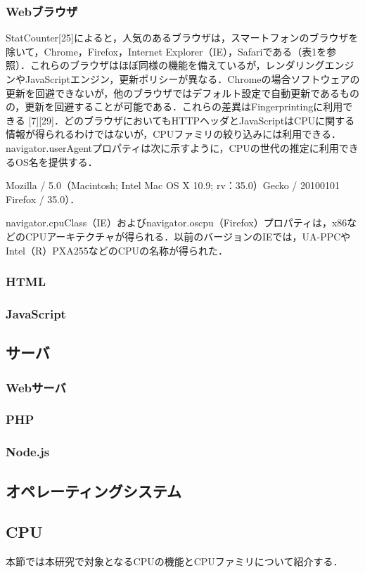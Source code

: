 \subsubsection{Webブラウザ}
StatCounter[25]によると，人気のあるブラウザは，スマートフォンのブラウザを除いて，Chrome，Firefox，Internet Explorer（IE），Safariである（表1を参照）．これらのブラウザはほぼ同様の機能を備えているが，レンダリングエンジンやJavaScriptエンジン，更新ポリシーが異なる．Chromeの場合ソフトウェアの更新を回避できないが，他のブラウザではデフォルト設定で自動更新であるものの，更新を回避することが可能である．これらの差異はFingerprintingに利用できる [7][29]．どのブラウザにおいてもHTTPヘッダとJavaScriptはCPUに関する情報が得られるわけではないが，CPUファミリの絞り込みには利用できる． navigator.userAgentプロパティは次に示すように，CPUの世代の推定に利用できるOS名を提供する．

Mozilla / 5.0（Macintosh; Intel Mac OS X 10.9; rv：35.0）Gecko / 20100101 Firefox / 35.0）．

navigator.cpuClass（IE）およびnavigator.oscpu（Firefox）プロパティは，x86などのCPUアーキテクチャが得られる．以前のバージョンのIEでは，UA-PPCやIntel（R）PXA255などのCPUの名称が得られた．

\subsubsection{HTML}
\subsubsection{JavaScript}
\subsection{サーバ}
\subsubsection{Webサーバ}
\subsubsection{PHP}
\subsubsection{Node.js}
\subsection{オペレーティングシステム}
\subsection{CPU}
本節では本研究で対象となるCPUの機能とCPUファミリについて紹介する．
